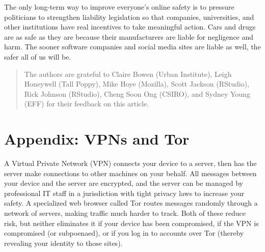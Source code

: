 \documentclass[10pt, letterpaper]{article}
\begin{document}
The only long-term way to improve everyone's online safety is to pressure
politicians to strengthen liability legislation so that companies, universities,
and other institutions have real incentives to take meaningful action. Cars and
drugs are as safe as they are because their manufacturers are liable for
negligence and harm. The sooner software companies and social media sites are
liable as well, the safer all of us will be.

\begin{quote}
  The authors are grateful to Claire Bowen (Urban Institute), Leigh Honeywell
  (Tall Poppy), Mike Hoye (Mozilla), Scott Jackson (RStudio), Rick Johnson
  (RStudio), Cheng Soon Ong (CSIRO), and Sydney Young (EFF) for their feedback
  on this article.
\end{quote}



\section*{Appendix: VPNs and Tor}
  
A Virtual Private Network (VPN) connects your device to a server, then has the
server make connections to other machines on your behalf. All messages between
your device and the server are encrypted, and the server can be managed by
professional IT staff in a jurisdiction with tight privacy laws to increase your
safety. A specialized web browser called Tor routes messages randomly through a
network of servers, making traffic much harder to track. Both of these reduce
risk, but neither eliminates it if your device has been compromised, if the VPN
is compromised (or subpoenaed), or if you log in to accounts over Tor (thereby
revealing your identity to those sites).
\end{document}

